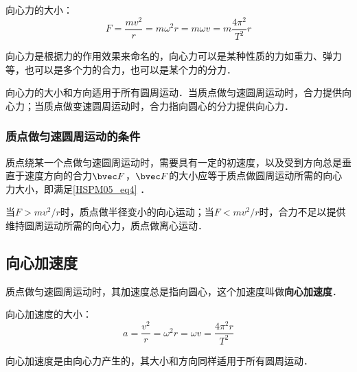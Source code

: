 向心力的大小：
\begin{equation}\label{HSPM05_eq4}
F=\frac{mv^2}{r}=m\omega^2r=m\omega v=m\frac{4\pi^2}{T^2}r
\end{equation}

向心力是根据力的作用效果来命名的，向心力可以是某种性质的力如重力、弹力等，也可以是多个力的合力，也可以是某个力的分力．

向心力的大小和方向适用于所有圆周运动．当质点做匀速圆周运动时，合力提供向心力；当质点做变速圆周运动时，合力指向圆心的分力提供向心力．

\subsubsection{质点做匀速圆周运动的条件}

质点绕某一个点做匀速圆周运动时，需要具有一定的初速度，以及受到方向总是垂直于速度方向的合力$\bvec F$，$\bvec F$的大小应等于质点做圆周运动所需的向心力大小，即满足\autoref{HSPM05_eq4} ．

当$F>mv^2/r$时，质点做半径变小的向心运动；当$F<mv^2/r$时，合力不足以提供维持圆周运动所需的向心力，质点做离心运动．

\subsection{向心加速度}

质点做匀速圆周运动时，其加速度总是指向圆心，这个加速度叫做\textbf{向心加速度}．

向心加速度的大小：
\begin{equation}
a=\frac{v^2}{r}=\omega^2r=\omega v=\frac{4\pi^2r}{T^2}
\end{equation}

向心加速度是由向心力产生的，其大小和方向同样适用于所有圆周运动．
